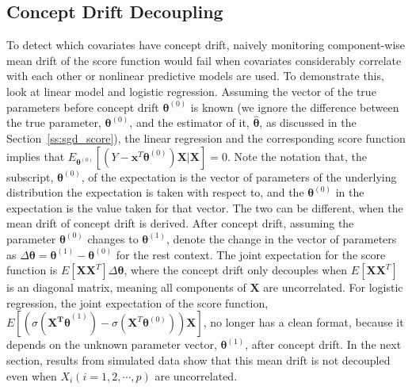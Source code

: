 \documentclass[twoside,11pt]{article}
\begin{document}
\subsection{Concept Drift Decoupling}
\label{ss:diagnosis}
To detect which covariates have concept drift, naively monitoring component-wise mean {drift} of the score function would fail when {covariates considerably correlate with each other} or nonlinear predictive models are used. To demonstrate this, look at linear model and logistic regression. Assuming the vector of the true parameters {before concept drift $\bm { \theta}^ { (0)}$} is known (we ignore the difference between the true parameter, $\bm { \theta}^ { (0)}$, and the estimator of it, $\hat{\bm { \theta}}$, as discussed in the Section~\ref{ss:sgd_score}), the linear regression and the corresponding score function implies that {$E_{\bm{ \theta}^{ (0)}}[(Y - \bm {x}^T\bm { \theta}^{ (0)} ) \bm {X}|\bm {X}]=0$}. Note the notation that, the subscript, ${ \bm{\theta}}^{ (0)}$, of the expectation is the vector of parameters of the underlying distribution the expectation is taken with respect to, and the $\bm{ \theta}^{ (0)}$ in the expectation is the value taken for that vector. The two can be different, when the mean drift of concept drift is derived. After concept drift, {assuming the parameter $\bm { \theta}^{ (0)}$ changes to $\bm { \theta} ^{ (1)}$, denote the change in the vector of parameters as $ \Delta \bm { \theta} = \bm { \theta} ^{ (1)} - \bm { \theta}^ { (0)}$ for the rest context.} {The} joint expectation for the score function is $E [\bm {X}\bm {X}^T] \Delta \bm { \theta}$, where the concept drift only decouples when $E [\bm {X}\bm {X}^T]$ is an {diagonal} matrix, meaning all components of $\bm{X}$ are uncorrelated. For logistic regression, the joint expectation of the score function, $E[(\sigma ( \bm {  \bm {X}^T \theta}^{ (1)}) - \sigma ( \bm {X}^T\bm { \theta}^{ (0)} )) \bm {X}]$,  no longer has a clean format, because it depends on the unknown parameter vector, $\bm { \theta} ^{ (1)}$, after concept drift. In the next section, results from simulated data show that this mean {drift} is not decoupled even when $X _{i} (i = 1,2, \cdots, p)$ are uncorrelated. 
\end{document}
